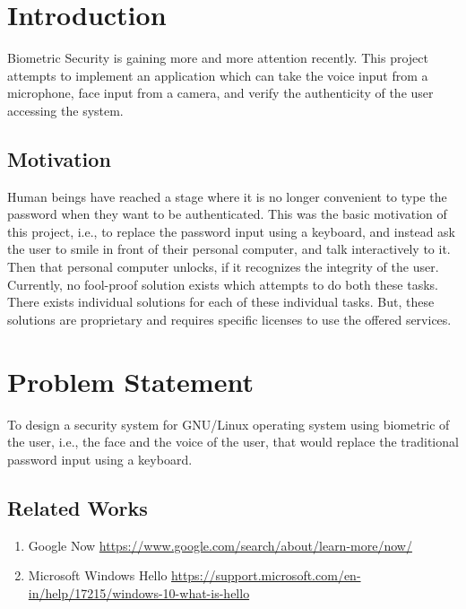 \chapter{Introduction}
Biometric Security is gaining more and more attention recently. This project
attempts to implement an application which can take the voice input from a
microphone, face input from a camera, and verify the authenticity of the user
accessing the system. \\

\section{Motivation}
Human beings have reached a stage where it is no longer convenient to type the
password when they want to be authenticated. This was the basic motivation of
this project, i.e., to replace the password input using a keyboard, and instead
ask the user to smile in front of their personal computer, and talk interactively
to it. Then that personal computer unlocks, if it recognizes the integrity of
the user. \\
Currently, no fool-proof solution exists which attempts to do both these tasks.
There exists individual solutions for each of these individual tasks. But, these
solutions are proprietary and requires specific licenses to use the offered
services. \\

\chapter{Problem Statement}
To design a security system for GNU/Linux operating system using biometric
of the user, i.e., the face and the voice of the user, that would replace the
traditional password input using a keyboard. \\

\section{Related Works}
\begin{enumerate}
  \item Google Now \url{https://www.google.com/search/about/learn-more/now/}
  \item Microsoft Windows Hello \url{https://support.microsoft.com/en-in/help/17215/windows-10-what-is-hello}
\end{enumerate}



